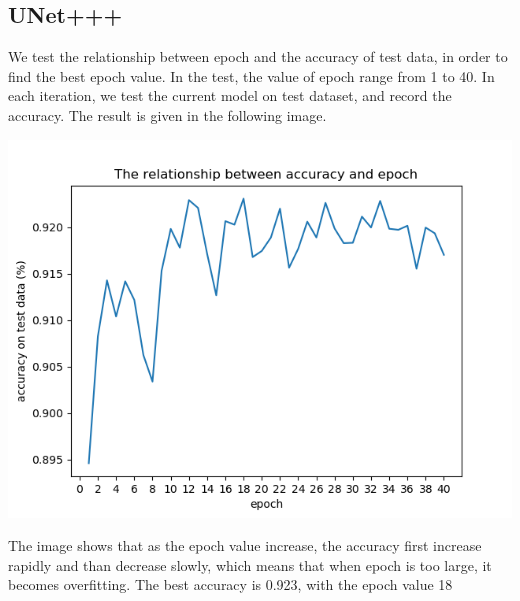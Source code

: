 \subsection{UNet+++}
We test the relationship between epoch and the accuracy of test data, in order to find the best epoch value. In the test, the value of epoch range from 1 to 40. 
In each iteration, we test the current model on test dataset, and record the accuracy. The result is given in the following image.

\includegraphics[width=\linewidth]{figuras/epoch_accuracy.png}

The image shows that as the epoch value increase, the accuracy first increase rapidly and than decrease slowly, 
which means that when epoch is too large, it becomes overfitting.
The best accuracy is 0.923, with the epoch value 18
